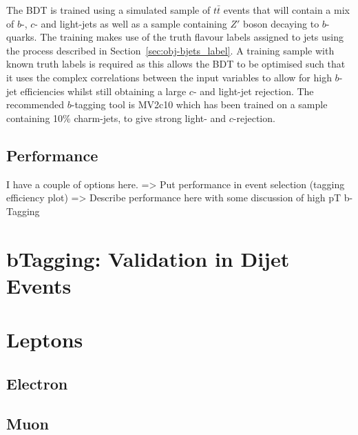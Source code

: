 The BDT is trained using a simulated sample of $t\bar{t}$ events that will contain a mix of  $b$-, $c$- and light-jets
as well as a sample containing $Z'$ boson decaying to $b$-quarks.
The training makes use of the truth flavour labels assigned to jets using the process described in Section~\ref{sec:obj-bjets_label}.
A training sample with known truth labels is required as this allows the BDT to be optimised
such that it uses the complex correlations between the input variables to allow for high $b$-jet efficiencies
whilst still obtaining a large $c$- and light-jet rejection.
The recommended $b$-tagging tool is MV2c10 which has been trained on a sample containing 10\% charm-jets, to give strong light- and $c$-rejection.

\subsection{Performance}

I have a couple of options here.
=> Put performance in event selection (tagging efficiency plot)
=> Describe performance here with some discussion of high pT b-Tagging

\section{bTagging: Validation in Dijet Events}

\section{Leptons}   
\subsection{Electron}
\label{sec:obj-electron}
\subsection{Muon}
\label{sec:obj-muon}

